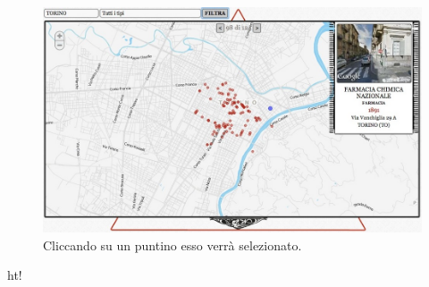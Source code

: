 \begin{figure}[ht!]
	\caption{Cliccando su un puntino esso verr\`a selezionato.}
	\centering
		\includegraphics[width=\textwidth]{img/s13.jpg}
\end{figure}ht!
